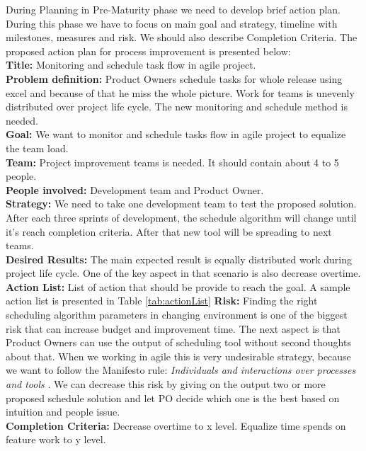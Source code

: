 During Planning in Pre-Maturity phase we need to develop brief action plan. During this phase we have to focus on main goal and strategy, timeline with milestones, measures and risk. We should also describe Completion Criteria. The proposed action plan for process improvement is presented below: \\
\textbf{Title:}  Monitoring and schedule task flow in agile project.\\
\textbf{Problem definition:} Product Owners schedule tasks for whole release using excel and because of that he miss the whole picture. Work for teams is unevenly distributed over project life cycle. The new monitoring and schedule method is needed.\\
\textbf{Goal:}  We want to monitor and schedule tasks flow in agile project to equalize the team load.\\
\textbf{Team:} Project improvement teams is needed. It should contain about 4 to 5 people.\\
\textbf{People involved:} Development team and Product Owner.\\
\textbf{Strategy:} We need to take one development team to test the proposed solution. After each three sprints of development, the schedule algorithm will change until it's reach completion criteria. After that new tool will be spreading to next teams.\\
\textbf{Desired Results:} The main expected result is equally distributed work during project life cycle. One of the key aspect in that scenario is also decrease overtime.\\
\textbf{Action List:} List of action that should be provide to reach the goal. A sample action list is presented in Table \ref{tab:actionList}
\textbf{Risk:} Finding the right scheduling algorithm parameters in changing environment is one of the biggest risk that can increase budget and improvement time. The next aspect is that Product Owners can use the output of scheduling tool without second thoughts about that. When we working in agile this is very undesirable strategy, because we want to follow the Manifesto rule: \textit{Individuals and interactions over processes and tools} \cite{manifesto}. We can decrease this risk by giving on the output two or more proposed schedule solution and let PO decide which one is the best based on intuition and people issue. \\
\textbf{Completion Criteria:} Decrease overtime to x level. Equalize  time spends on feature work to y level.


